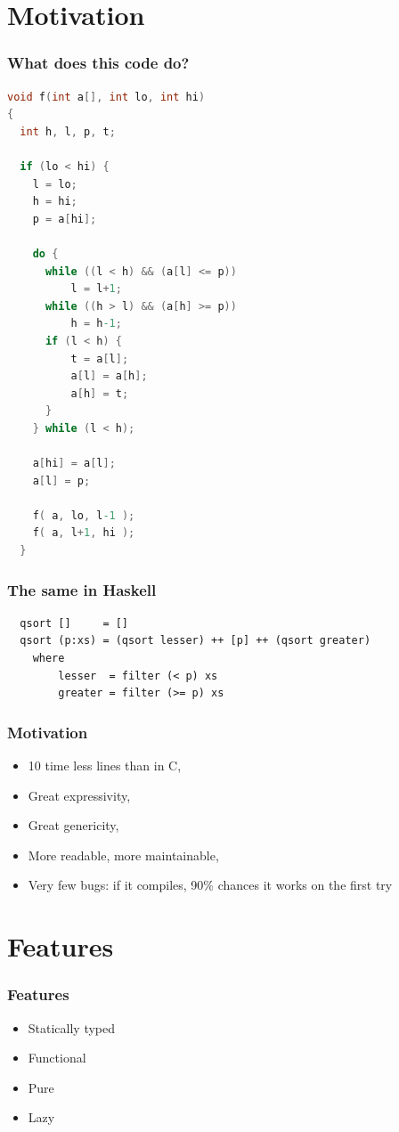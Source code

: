 \documentclass{beamer}
\begin{document}
\section{Motivation}

\begin{frame}[fragile]
\frametitle{What does this code do?}

\begin{lstlisting}[language=C, basicstyle=\tiny]
void f(int a[], int lo, int hi) 
{
  int h, l, p, t;

  if (lo < hi) {
    l = lo;
    h = hi;
    p = a[hi];

    do {
      while ((l < h) && (a[l] <= p)) 
          l = l+1;
      while ((h > l) && (a[h] >= p))
          h = h-1;
      if (l < h) {
          t = a[l];
          a[l] = a[h];
          a[h] = t;
      }
    } while (l < h);

    a[hi] = a[l];
    a[l] = p;

    f( a, lo, l-1 );
    f( a, l+1, hi );
  }
\end{lstlisting}

\end{frame}

\begin{frame}[fragile]
\frametitle{The same in Haskell}

\begin{lstlisting}
  qsort []     = []
  qsort (p:xs) = (qsort lesser) ++ [p] ++ (qsort greater)
    where
        lesser  = filter (< p) xs
        greater = filter (>= p) xs

\end{lstlisting}

\end{frame}

\begin{frame}
\frametitle{Motivation}

 \begin{itemize}
  \item 10 time less lines than in C,
  \item Great expressivity,
  \item Great genericity,
  \item More readable, more maintainable,
  \item Very few bugs: if it compiles, 90\% chances it works on the first try
 \end{itemize}

\end{frame}


\section{Features}
\begin{frame}
\frametitle{Features}

 \begin{itemize}
  \item Statically typed
  \item Functional
  \item Pure
  \item Lazy
 \end{itemize}

\end{frame}
\end{document}
